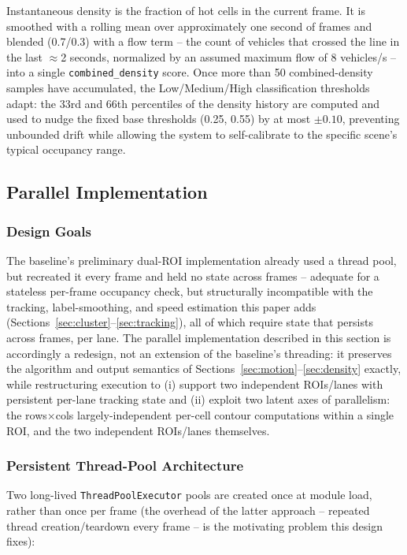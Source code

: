 \documentclass[conference]{IEEEtran}
\newcommand{\code}[1]{\texttt{#1}}
\begin{document}
Instantaneous density is the fraction of hot cells in the current
frame. It is smoothed with a rolling mean over approximately one second
of frames and blended (0.7/0.3) with a flow term -- the count of
vehicles that crossed the line in the last $\approx$2 seconds,
normalized by an assumed maximum flow of 8 vehicles/s -- into a single
\code{combined\_density} score. Once more than 50 combined-density
samples have accumulated, the Low/Medium/High classification thresholds
adapt: the 33rd and 66th percentiles of the density history are computed
and used to nudge the fixed base thresholds (0.25, 0.55) by at most
$\pm0.10$, preventing unbounded drift while allowing the system to
self-calibrate to the specific scene's typical occupancy range.

\subsection{Parallel Implementation}
\label{sec:parallel}

\subsubsection{Design Goals}
The baseline's \cite{baseline} preliminary dual-ROI implementation
already used a thread pool, but recreated it every frame and held no
state across frames -- adequate for a stateless per-frame occupancy
check, but structurally incompatible with the tracking, label-smoothing,
and speed estimation this paper adds (Sections~\ref{sec:cluster}--\ref{sec:tracking}),
all of which require state that persists across frames, per lane. The
parallel implementation described in this section is accordingly a
redesign, not an extension of the baseline's threading: it preserves
the algorithm and output semantics of Sections~\ref{sec:motion}--\ref{sec:density}
exactly, while restructuring execution to (i) support two independent
ROIs/lanes with persistent per-lane tracking state and (ii) exploit two
latent axes of parallelism: the rows$\times$cols largely-independent
per-cell contour computations within a single ROI, and the two
independent ROIs/lanes themselves.

\subsubsection{Persistent Thread-Pool Architecture}
Two long-lived \code{ThreadPoolExecutor} pools are created once at
module load, rather than once per frame (the overhead of the latter
approach -- repeated thread creation/teardown every frame -- is the
motivating problem this design fixes):
\end{document}
